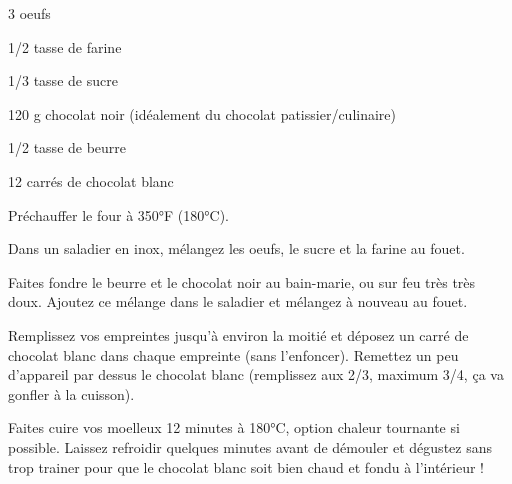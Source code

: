 


\totaltime{}


\begin{ingredients}
    \item 3 oeufs
    \item 1/2 tasse de farine
    \item 1/3 tasse de sucre
    \item 120 g chocolat noir (idéalement du chocolat patissier/culinaire)
    \item 1/2 tasse de beurre
    \item 12 carrés de chocolat blanc
\end{ingredients}

\begin{steps}
    \item Préchauffer le four à 350°F (180°C).
    \item Dans un saladier en inox, mélangez les oeufs, le sucre et la farine au fouet.
    \item Faites fondre le beurre et le chocolat noir au bain-marie, ou sur feu très très doux. Ajoutez ce mélange dans le saladier et mélangez à nouveau au fouet.
    \item Remplissez vos empreintes jusqu'à environ la moitié et déposez un carré de chocolat blanc dans chaque empreinte (sans l'enfoncer). Remettez un peu d'appareil par dessus le chocolat blanc (remplissez aux 2/3, maximum 3/4, ça va gonfler à la cuisson).
    \item Faites cuire vos moelleux 12 minutes à 180°C, option chaleur tournante si possible. Laissez refroidir quelques minutes avant de démouler et dégustez sans trop trainer pour que le chocolat blanc soit bien chaud et fondu à l'intérieur !
\end{steps}

